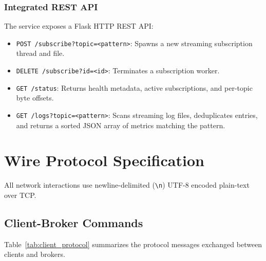\documentclass[11pt,a4paper]{article}
\begin{document}
\subsubsection{Integrated REST API}
The service exposes a Flask HTTP REST API:
\begin{itemize}[leftmargin=*]
    \item \texttt{POST /subscribe?topic=<pattern>}: Spawns a new streaming subscription thread and file.
    \item \texttt{DELETE /subscribe?id=<id>}: Terminates a subscription worker.
    \item \texttt{GET /status}: Returns health metadata, active subscriptions, and per-topic byte offsets.
    \item \texttt{GET /logs?topic=<pattern>}: Scans streaming log files, deduplicates entries, and returns a sorted JSON array of metrics matching the pattern.
\end{itemize}

\section{Wire Protocol Specification}
\label{sec:protocol}
All network interactions use newline-delimited (\texttt{\textbackslash n}) UTF-8 encoded plain-text over TCP.

\subsection{Client-Broker Commands}
Table~\ref{tab:client_protocol} summarizes the protocol messages exchanged between clients and brokers.
\end{document}
